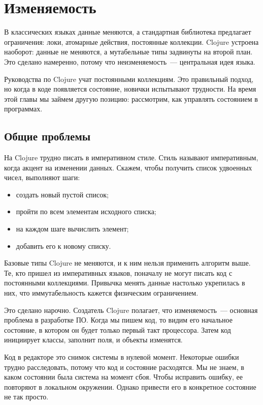 \chapter{Изменяемость}

\begin{teaser}
В классических языках данные меняются, а стандартная библиотека предлагает
ограничения: локи, атомарные действия, постоянные коллекции. Clojure устроена
наоборот: данные не меняются, а мутабельные типы задвинуты на второй план. Это
сделано намеренно, потому что неизменяемость~--- центральная идея языка.
\end{teaser}

Руководства по Clojure учат постоянными коллекциям. Это правильный подход, но
когда в коде появляется состояние, новички испытывают трудности. На время этой
главы мы займем другую позицию: рассмотрим, как управлять состоянием в
программах.

\section{Общие проблемы}

На Clojure трудно писать в императивном стиле. Стиль называют императивным,
когда акцент на изменении данных. Скажем, чтобы получить список удвоенных чисел,
выполняют шаги:

\begin{itemize}
\item
  создать новый пустой список;
\item
  пройти по всем элементам исходного списка;
\item
  на каждом шаге вычислить элемент;
\item
  добавить его к новому списку.
\end{itemize}

Базовые типы Clojure не меняются, и к ним нельзя применить алгоритм выше. Те,
кто пришел из императивных языков, поначалу не могут писать код с постоянными
коллекциями. Привычка менять данные настолько укрепилась в них, что
иммутабельность кажется физическим ограничением.

Это сделано нарочно. Создатель Clojure полагает, что изменяемость~--- основная
проблема в разработке ПО. Когда мы пишем код, то видим его начальное состояние,
в котором он будет только первый такт процессора. Затем код инициирует классы,
заполнит поля, и объекты изменятся.

Код в редакторе это снимок системы в нулевой момент. Некоторые ошибки трудно
расследовать, потому что код и состояние расходятся. Мы не знаем, в каком
состоянии была система на момент сбоя. Чтобы исправить ошибку, ее повторяют в
локальном окружении. Однако привести его в конкретное состояние не так просто.

